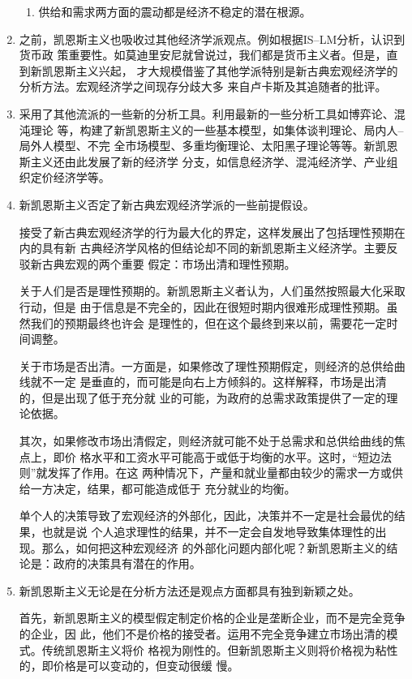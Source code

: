 \begin{enumerate}
\begin{enumerate}
  \item 供给和需求两方面的震动都是经济不稳定的潜在根源。
  \end{enumerate}


\item 之前，凯恩斯主义也吸收过其他经济学派观点。例如根据IS--LM分析，认识到货币政
  策重要性。如莫迪里安尼就曾说过，我们都是货币主义者。但是，直到新凯恩斯主义兴起，
  才大规模借鉴了其他学派特别是新古典宏观经济学的分析方法。宏观经济学之间现存分歧大多
  来自卢卡斯及其追随者的批评。


\item 采用了其他流派的一些新的分析工具。利用最新的一些分析工具如博弈论、混沌理论
  等，构建了新凯恩斯主义的一些基本模型，如集体谈判理论、局内人--局外人模型、不完
  全市场模型、多重均衡理论、太阳黑子理论等等。新凯恩斯主义还由此发展了新的经济学
  分支，如信息经济学、混沌经济学、产业组织定价经济学等。

\item 新凯恩斯主义否定了新古典宏观经济学派的一些前提假设。

  接受了新古典宏观经济学的行为最大化的界定，这样发展出了包括理性预期在内的具有新
  古典经济学风格的但结论却不同的新凯恩斯主义经济学。主要反驳新古典宏观的两个重要
  假定：市场出清和理性预期。

  关于人们是否是理性预期的。新凯恩斯主义者认为，人们虽然按照最大化采取行动，但是
  由于信息是不完全的，因此在很短时期内很难形成理性预期。虽然我们的预期最终也许会
  是理性的，但在这个最终到来以前，需要花一定时间调整。

  关于市场是否出清。一方面是，如果修改了理性预期假定，则经济的总供给曲线就不一定
  是垂直的，而可能是向右上方倾斜的。这样解释，市场是出清的，但是出现了低于充分就
  业的可能，为政府的总需求政策提供了一定的理论依据。

  其次，如果修改市场出清假定，则经济就可能不处于总需求和总供给曲线的焦点上，即价
  格水平和工资水平可能高于或低于均衡的水平。这时，“短边法则”就发挥了作用。在这
  两种情况下，产量和就业量都由较少的需求一方或供给一方决定，结果，都可能造成低于
  充分就业的均衡。

  单个人的决策导致了宏观经济的外部化，因此，决策并不一定是社会最优的结果，也就是说
  个人追求理性的结果，并不一定会自发地导致集体理性的出现。那么，如何把这种宏观经济
  的外部化问题内部化呢？新凯恩斯主义的结论是：政府的决策具有潜在的作用。

\item 新凯恩斯主义无论是在分析方法还是观点方面都具有独到新颖之处。

  首先，新凯恩斯主义的模型假定制定价格的企业是垄断企业，而不是完全竞争的企业，因
  此，他们不是价格的接受者。运用不完全竞争建立市场出清的模式。传统凯恩斯主义将价
  格视为刚性的。但新凯恩斯主义则将价格视为粘性的，即价格是可以变动的，但变动很缓
  慢。


\end{enumerate}
